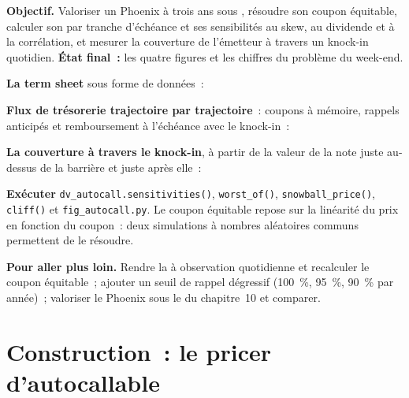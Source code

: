 \begin{tutorial}
\textbf{Objectif.} Valoriser un Phoenix à trois ans sous , résoudre son coupon équitable, calculer son  par tranche d'échéance et ses
sensibilités au skew, au dividende et à la corrélation, et mesurer la couverture de l'émetteur à travers un knock-in quotidien. \textbf{État final~:} les quatre
figures et les chiffres du problème du week-end.
\begin{tutsteps}
\item \textbf{La term sheet} sous forme de données~:
\label{lst:dv:autocallables:termsheet}
\item \textbf{Flux de trésorerie trajectoire par trajectoire}~: coupons à mémoire, rappels anticipés et remboursement à l'échéance avec le knock-in~:
\label{lst:dv:autocallables:cashflows}
\item \textbf{La couverture à travers le knock-in}, à partir de la valeur de la note juste au-dessus de la barrière et juste après elle~:
\label{lst:dv:autocallables:cliff}
\item \textbf{Exécuter} \texttt{dv\_autocall.sensitivities()}, \texttt{worst\_of()}, \texttt{snowball\_price()}, \texttt{cliff()} et
\texttt{fig\_autocall.py}. Le coupon équitable repose sur la linéarité du prix en fonction du coupon~: deux simulations à nombres
aléatoires communs permettent de le résoudre.
\end{tutsteps}
\textbf{Pour aller plus loin.} Rendre la  à observation quotidienne et recalculer le coupon équitable~; ajouter un seuil de rappel dégressif (100~\%,
95~\%, 90~\% par année)~; valoriser le Phoenix sous le  du chapitre~10 et comparer.
\end{tutorial}

\section{Construction~: le pricer d'autocallable}\label{bld:dv:autocallables:autocall}

